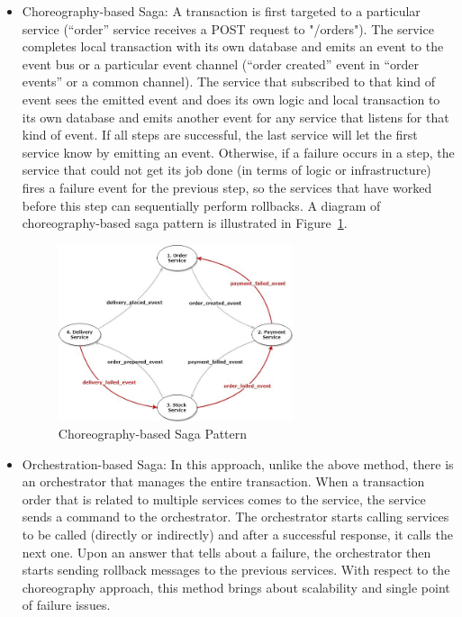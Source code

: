 \documentclass{Configuration_Files/PoliMi3i_thesis}
\begin{document}
\begin{itemize}
    \item Choreography-based Saga: A transaction is first targeted to a particular service (“order” service receives a POST request to "/orders").
    The service completes local transaction with its own database and emits an event to the event bus or a particular event channel (“order created” event in “order events” or a common channel).
    The service that subscribed to that kind of event sees the emitted event and does its own logic and local transaction to its own database and emits another event for any service that listens for that kind of event.
    If all steps are successful, the last service will let the first service know by emitting an event.
    Otherwise, if a failure occurs in a step, the service that could not get its job done (in terms of logic or infrastructure) fires a failure event for the previous step, so the services that have worked before this step can sequentially perform rollbacks.
    A diagram of choreography-based saga pattern is illustrated in Figure~\ref{fig:saga}.
    
    \begin{figure}[H]
    \centering
    \includegraphics[width=0.65\textwidth]{myImages/saga.jpeg}
    \caption{Choreography-based Saga Pattern}
    \label{fig:saga}
    \end{figure}
    
    \item Orchestration-based Saga: In this approach, unlike the above method, there is an orchestrator that manages the entire transaction.
    When a transaction order that is related to multiple services comes to the service, the service sends a command to the orchestrator.
    The orchestrator starts calling services to be called (directly or indirectly) and after a successful response, it calls the next one. Upon an answer that tells about a failure, the orchestrator then starts sending rollback messages to the previous services.
    With respect to the choreography approach, this method brings about scalability and single point of failure issues.

\end{itemize}
\end{document}
